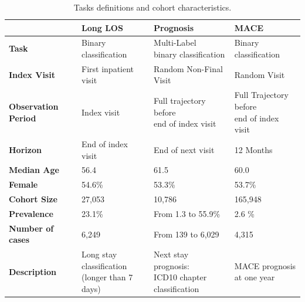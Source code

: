 \documentclass[french,12pt,twoside,a4paper]{book}
\begin{document}
\begin{table}[!ht]
{    \begin{tabular}{|l|l|l|l|}
      \hline
      \textbf{}                   & \textbf{Long LOS}                     & \textbf{Prognosis}                  & \textbf{MACE} \\ \hline
      \textbf{Task}               & Binary classification                 & \makecell[l]{Multi-Label                            \\binary classification}                                       & Binary classification                             \\ \hline
      \textbf{Index Visit}        & First inpatient visit                 & Random Non-Final Visit              & Random Visit  \\ \hline
      \textbf{Observation Period} & Index visit                           & \makecell[l]{Full trajectory before                 \\end of index visit}                           & \makecell[l]{Full Trajectory before\\end of index visit} \\ \hline
      \textbf{Horizon}            & End of index visit                    & End of next visit                   & 12 Months     \\ \hline
      \textbf{Median Age}         & 56.4                                  & 61.5                                & 60.0          \\ \hline
      \textbf{Female}             & 54.6\%                                & 53.3\%                              & 53.7\%        \\ \hline
      \textbf{Cohort Size}        & 27,053                                & 10,786                              & 165,948       \\ \hline
      \textbf{Prevalence}         & 23.1\%                                & From 1.3 to 55.9\%                  & 2.6 \%        \\ \hline
      \textbf{Number of cases}    & 6,249                                 & From 139 to 6,029                   & 4,315         \\ \hline
      \textbf{Description}        & \makecell[l]{Long stay classification                                                       \\ (longer than 7 days)} & \makecell[l]{Next stay prognosis:\\ICD10 chapter classification} & \makecell[l]{MACE prognosis\\at one year}                                      \\ \hline
    \end{tabular}
  }
  \vspace{1em}%
  \caption{Tasks definitions and cohort characteristics.}%
  \label{table:predictive_tasks_summary}%
\end{table}
\end{document}
